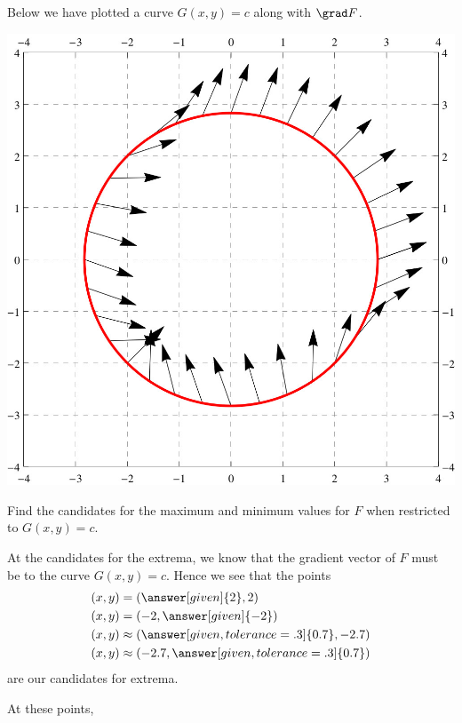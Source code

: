 \documentclass{ximera}
\begin{document}
\begin{example}
  Below we have plotted a curve $G(x,y) = c$ along with $\grad F$.
  \begin{image}
    \includegraphics{curveVectors1.jpg}
  \end{image}
  Find the candidates for the maximum and minimum values for $F$ when
  restricted to $G(x,y) = c$.
  \begin{explanation}
    At the candidates for the extrema, we know that the gradient
    vector of $F$ must be
     to
    the curve $G(x,y) = c$. Hence we
    see that the points
    \begin{align*}
      (x,y) &= \left(\answer[given]{2},2\right)\\
      (x,y) &= \left(-2,\answer[given]{-2}\right)\\
      (x,y) &\approx \left(\answer[given,tolerance=.3]{0.7},-2.7\right)\\
      (x,y) &\approx \left(-2.7,\answer[given,tolerance=.3]{0.7}\right)
    \end{align*}
    are our candidates for extrema.
        \begin{feedback}[correct]
      At these points,
      \begin{image}

\end{image}
\end{feedback}
\end{explanation}
\end{example}
\end{document}
